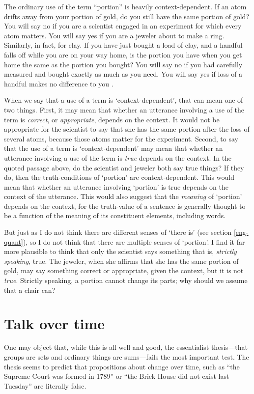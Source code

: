 \documentclass[11pt]{article}
\newenvironment{squote}{%
\begin{spacing}{1}
\begin{list}{}{%
\setlength{\labelwidth}{0pt}%
\rightmargin\leftmargin%
}
\item\relax
}{%
\end{list}%
\end{spacing}
}
\begin{document}
\begin{spacing}{1.5}
\begin{squote}
The ordinary use of the term ``portion'' is heavily context-dependent.
If an atom drifts away from your portion of gold, do you still have
the same portion of gold?  You will say no if you are a scientist
engaged in an experiment for which every atom matters. You will say
yes if you are a jeweler about to make a ring.  Similarly, in fact,
for clay.  If you have just bought a load of clay, and a handful falls
off while you are on your way home, is the portion you have when you
get home the same as the portion you bought?  You will say no if you
had carefully measured and bought exactly as much as you need.  You
will say yes if loss of a handful makes no difference to you
\citeyearpar[163]{thomson1998a}.
\end{squote}

When we say that a use of a term is `context-dependent', that can mean
one of two things.  First, it may mean that whether an utterance
involving a use of the term is {\em correct}, or {\em appropriate},
depends on the context.  It would not be appropriate for the scientist
to say that she has the same portion after the loss of several atoms,
because those atoms matter for the experiment.  Second, to say that
the use of a term is `context-dependent' may mean that whether an
utterance involving a use of the term is {\em true} depends on the
context.  In the quoted passage above, do the scientist and jeweler
both say true things?  If they do, then the truth-conditions of
`portion' are context-dependent.  This would mean that whether an
utterance involving `portion' is true depends on the context of the
utterance.  This would also suggest that the {\em meaning} of
`portion' depends on the context, for the truth-value of a sentence is
generally thought to be a function of the meaning of its constituent
elements, including words.

But just as I do not think there are different senses of `there is'
(see section \ref{eng-quant}), so I do not think that there are
multiple senses of `portion'.  I find it far more plausible to think
that only the scientist says something that is, {\em strictly
  speaking}, true.  The jeweler, when she affirms that she has the
same portion of gold, may say something correct or appropriate, given
the context, but it is not {\em true}.  Strictly speaking, a portion
cannot change its parts; why should we assume that a chair can?

\section{Talk over time}
\label{time-talk}
One may object that, while this is all well and good, the essentialist
thesis---that groups are sets and ordinary things are sums---fails the
most important test.  The thesis seems to predict that propositions
about change over time, such as ``the Supreme Court was formed in
1789'' or ``the Brick House did not exist last Tuesday'' are literally
false.


\end{spacing}
\end{document}
